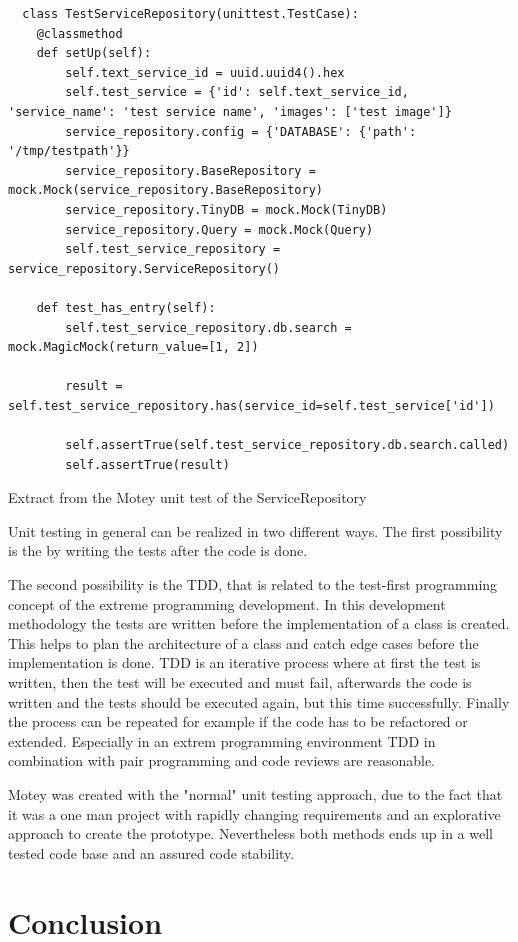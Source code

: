 \begin{listing}[H]
  \begin{verbatim}
  class TestServiceRepository(unittest.TestCase):
    @classmethod
    def setUp(self):
        self.text_service_id = uuid.uuid4().hex
        self.test_service = {'id': self.text_service_id, 'service_name': 'test service name', 'images': ['test image']}
        service_repository.config = {'DATABASE': {'path': '/tmp/testpath'}}
        service_repository.BaseRepository = mock.Mock(service_repository.BaseRepository)
        service_repository.TinyDB = mock.Mock(TinyDB)
        service_repository.Query = mock.Mock(Query)
        self.test_service_repository = service_repository.ServiceRepository()

    def test_has_entry(self):
        self.test_service_repository.db.search = mock.MagicMock(return_value=[1, 2])

        result = self.test_service_repository.has(service_id=self.test_service['id'])

        self.assertTrue(self.test_service_repository.db.search.called)
        self.assertTrue(result)
  \end{verbatim}
  \caption{Extract from the Motey unit test of the ServiceRepository}
  \label{code:sample_unit_test}
\end{listing}

\newline

Unit testing in general can be realized in two different ways.
The first possibility is the by writing the tests after the code is done.
\newline

The second possibility is the \ac{TDD}, that is related to the test-first programming concept of the extreme programming development.
In this development methodology the tests are written before the implementation of a class is created.
This helps to plan the architecture of a class and catch edge cases before the implementation is done.
\ac{TDD} is an iterative process where at first the test is written, then the test will be executed and must fail, afterwards the code is written and the tests should be executed again, but this time successfully.
Finally the process can be repeated for example if the code has to be refactored or extended.
Especially in an extrem programming environment \ac{TDD} in combination with pair programming and code reviews are reasonable.\newline

Motey was created with the "normal" unit testing approach, due to the fact that it was a one man project with rapidly changing requirements and an explorative approach to create the prototype.
Nevertheless both methods ends up in a well tested code base and an assured code stability.

\section{Conclusion}
\doit
